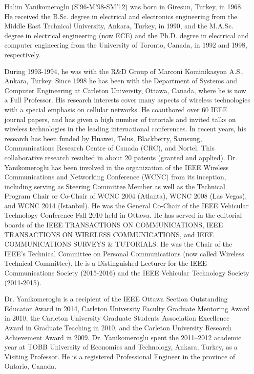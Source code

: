 \documentclass[journal]{IEEEtran}
\begin{document}
\begin{IEEEbiography}{Halim Yanikomeroglu}
(S'96-M'98-SM'12) was born in Giresun, Turkey, in 1968. He received the B.Sc. degree in electrical and electronics engineering from the Middle East Technical University, Ankara, Turkey, in 1990, and the M.A.Sc. degree in electrical engineering (now ECE) and the Ph.D. degree in electrical and computer engineering from the University of Toronto, Canada, in 1992 and 1998, respectively.

During 1993-1994, he was with the R\&D Group of Marconi Kominikasyon A.S., Ankara, Turkey. Since 1998 he has been with the Department of Systems and Computer Engineering at Carleton University, Ottawa, Canada, where he is now a Full Professor. His research interests cover many aspects of wireless technologies with a special emphasis on cellular networks. He coauthored over 60 IEEE journal papers, and has given a high number of tutorials and invited talks on wireless technologies in the leading international conferences. In recent years, his research has been funded by Huawei, Telus, Blackberry, Samsung, Communications Research Centre of Canada (CRC), and Nortel. This collaborative research resulted in about 20 patents (granted and applied). Dr. Yanikomeroglu has been involved in the organization of the IEEE Wireless Communications and Networking Conference (WCNC) from its inception, including serving as Steering Committee Member as well as the Technical Program Chair or Co-Chair of WCNC 2004 (Atlanta), WCNC 2008 (Las Vegas), and WCNC 2014 (Istanbul). He was the General Co-Chair of the IEEE Vehicular Technology Conference Fall 2010 held in Ottawa. He has served in the editorial boards of the IEEE TRANSACTIONS ON COMMUNICATIONS, IEEE TRANSACTIONS ON WIRELESS COMMUNICATIONS, and IEEE COMMUNICATIONS SURVEYS \& TUTORIALS. He was the Chair of the IEEE’s Technical Committee on Personal Communications (now called Wireless Technical Committee). He is a Distinguished Lecturer for the IEEE Communications Society (2015-2016) and the IEEE Vehicular Technology Society (2011-2015).

Dr. Yanikomeroglu is a recipient of the IEEE Ottawa Section Outstanding Educator Award in 2014, Carleton University Faculty Graduate Mentoring Award in 2010, the Carleton University Graduate Students Association Excellence Award in Graduate Teaching in 2010, and the Carleton University Research Achievement Award in 2009. Dr. Yanikomeroglu spent the 2011–2012 academic year at TOBB University of Economics and Technology, Ankara, Turkey, as a Visiting Professor. He is a registered Professional Engineer in the province of Ontario, Canada.
\end{IEEEbiography}
\end{document}
